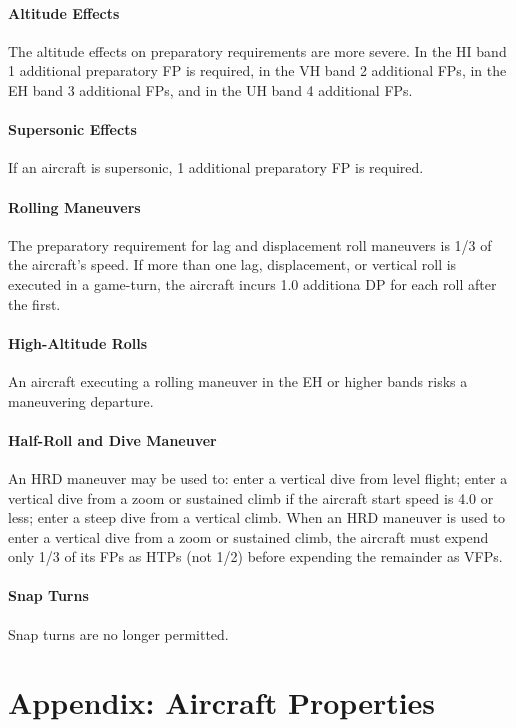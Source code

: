 \documentclass[10pt]{article}
\begin{document}
\paragraph{Altitude Effects} The altitude effects on preparatory requirements are more severe. In the HI band 1 additional preparatory FP is required, in the VH band 2 additional FPs, in the EH band 3 additional FPs, and in the UH band 4 additional FPs.

\paragraph{Supersonic Effects} If an aircraft is supersonic, 1 additional preparatory FP is required.

\paragraph{Rolling Maneuvers} The preparatory requirement for lag and displacement roll maneuvers is 1/3 of the aircraft's speed. If more than one lag, displacement, or vertical roll is executed in a game-turn, the aircraft incurs 1.0 additiona DP for each roll after the first.

\paragraph{High-Altitude Rolls} An aircraft executing a rolling maneuver in the EH or higher bands risks a maneuvering departure.

\paragraph{Half-Roll and Dive Maneuver} An HRD maneuver may be used to: enter a vertical dive from level flight; enter a vertical dive from a zoom or sustained climb if the aircraft start speed is 4.0 or less; enter a steep dive from a vertical climb. When an HRD maneuver is used to enter a vertical dive from a zoom or sustained climb, the aircraft must expend only 1/3 of its FPs as HTPs (not 1/2) before expending the remainder as VFPs.

\paragraph{Snap Turns} Snap turns are no longer permitted.

\section{Appendix: Aircraft Properties}
\end{document}
